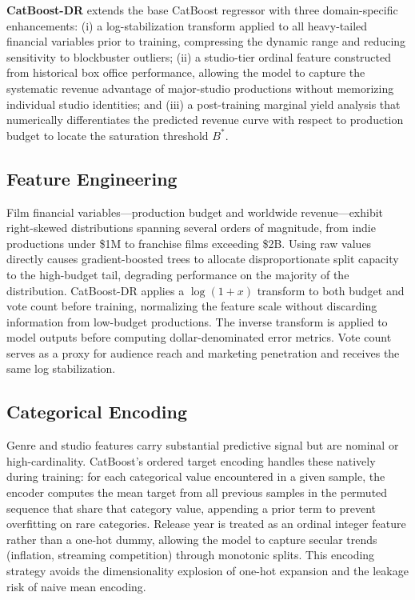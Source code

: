 \documentclass[journal]{IEEEtran}
\begin{document}
\textbf{CatBoost-DR} extends the base CatBoost regressor with three domain-specific enhancements: (i) a log-stabilization transform applied to all heavy-tailed financial variables prior to training, compressing the dynamic range and reducing sensitivity to blockbuster outliers; (ii) a studio-tier ordinal feature constructed from historical box office performance, allowing the model to capture the systematic revenue advantage of major-studio productions without memorizing individual studio identities; and (iii) a post-training marginal yield analysis that numerically differentiates the predicted revenue curve with respect to production budget to locate the saturation threshold \(B^*\).

\subsection{Feature Engineering}


Film financial variables—production budget and worldwide revenue—exhibit right-skewed distributions spanning several orders of magnitude, from indie productions under \$1M to franchise films exceeding \$2B. Using raw values directly causes gradient-boosted trees to allocate disproportionate split capacity to the high-budget tail, degrading performance on the majority of the distribution. CatBoost-DR applies a \(\log(1 + x)\) transform to both budget and vote count before training, normalizing the feature scale without discarding information from low-budget productions. The inverse transform is applied to model outputs before computing dollar-denominated error metrics. Vote count serves as a proxy for audience reach and marketing penetration and receives the same log stabilization.

\subsection{Categorical Encoding}


Genre and studio features carry substantial predictive signal but are nominal or high-cardinality. CatBoost's ordered target encoding handles these natively during training: for each categorical value encountered in a given sample, the encoder computes the mean target from all previous samples in the permuted sequence that share that category value, appending a prior term to prevent overfitting on rare categories. Release year is treated as an ordinal integer feature rather than a one-hot dummy, allowing the model to capture secular trends (inflation, streaming competition) through monotonic splits. This encoding strategy avoids the dimensionality explosion of one-hot expansion and the leakage risk of naive mean encoding.
\end{document}

